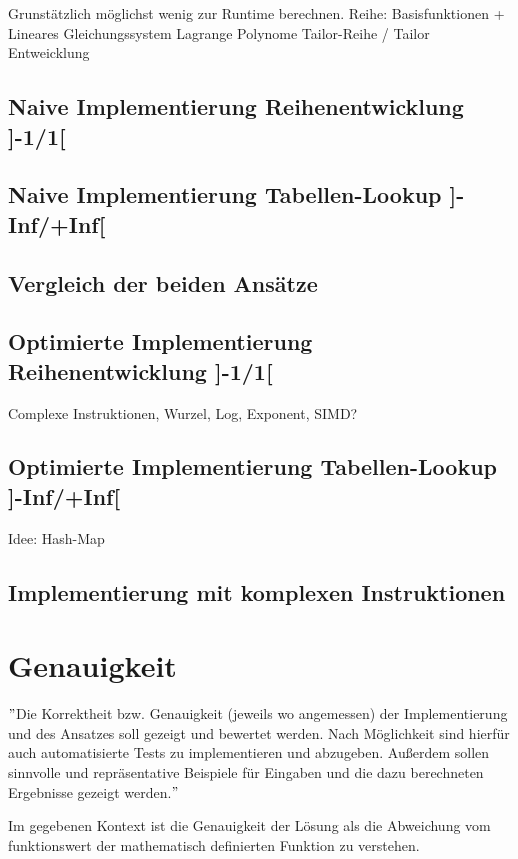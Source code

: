 \documentclass[course=erap]{aspdoc}
\begin{document}
    Grunstätzlich möglichst wenig zur Runtime berechnen.
    Reihe: Basisfunktionen + Lineares Gleichungssystem
    Lagrange Polynome
    Tailor-Reihe / Tailor Entweicklung

    \subsection{Naive Implementierung Reihenentwicklung ]-1/1[}

    \subsection{Naive Implementierung Tabellen-Lookup ]-Inf/+Inf[}

    \subsection{Vergleich der beiden Ansätze}

    \subsection{Optimierte Implementierung Reihenentwicklung ]-1/1[}
    Complexe Instruktionen, Wurzel, Log, Exponent, SIMD?

    \subsection{Optimierte Implementierung Tabellen-Lookup ]-Inf/+Inf[}
    Idee: Hash-Map

    \subsection{Implementierung mit komplexen Instruktionen}


    \section{Genauigkeit}
    \("\)Die Korrektheit bzw. Genauigkeit (jeweils wo angemessen) der Implementierung und des Ansatzes
    soll gezeigt und bewertet werden.
    Nach Möglichkeit sind hierfür auch automatisierte Tests zu implementieren und abzugeben.
    Außerdem sollen sinnvolle und repräsentative Beispiele für Eingaben und die dazu berechneten Ergebnisse gezeigt werden.\("\)

    Im gegebenen Kontext ist die Genauigkeit der Lösung als die Abweichung vom funktionswert der mathematisch definierten Funktion zu verstehen.
\end{document}
